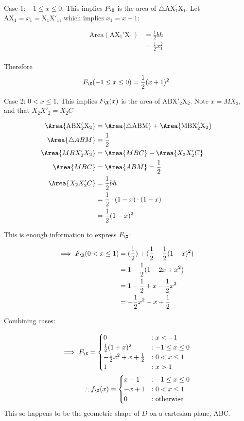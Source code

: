 Case 1: $-1 \leq x \leq 0$.
This implies $F_\X$ is the area of $\triangle\mathrm{A X_{1}^{\prime} X_1}$.
Let $\mathrm{AX_1} = x_1 = \mathrm{X_1 X'_1}$, which implies $x_1 = x + 1$:

\begin{align*}
\mathrm{Area(AX_1'X_1)} &= \frac{1}{2}bh \\
&= \frac{1}{2}x_1^2 \\
\end{align*}

Therefore
\[
F_\X(-1 \leq x \leq 0) = \frac{1}{2}(x + 1)^2
\]

Case 2: $0 < x \leq 1$.
This implies $F_\X(x)$ is the area of $\mathrm{ABX'_2X_2}$.
Note $x = MX_2$, and that $X_2X'_2 = X_2C$

\begin{align*}
\Area{\mathrm{ABX'_2X_2}} &= \Area{\triangle\mathrm{ABM}} + \Area{\mathrm{MBX_2'X_2}} \\
\Area{\triangle ABM} &= \frac{1}{2} \\
\Area{MBX'_2X_2} &= \Area{MBC} - \Area{X_2X_2'C} \\
\Area{MBC} &= \Area{ABM} = \frac{1}{2} \\
\Area{X_2X_2'C} &= \frac{1}{2}bh \\
&= \frac{1}{2} \cdot (1 - x) \cdot (1 - x) \\
&= \frac{1}{2}(1-x)^2 \\
\end{align*}

This is enough information to express $F_\X$:

\begin{align*}
\implies F_\X(0 < x \leq 1) &= (\frac{1}{2}) + (\frac{1}{2} - \frac{1}{2}(1 - x)^2) \\
&= 1 - \frac{1}{2}(1 - 2x + x^2) \\
&= 1 - \frac{1}{2} + x - \frac{1}{2}x^2 \\
&= -\frac{1}{2}x^2 + x + \frac{1}{2}
\end{align*}

Combining cases:

\begin{align*}
\implies F_\X =
\begin{cases}
0 &: x < -1 \\
\frac{1}{2}(1 + x)^2 &: -1 \leq x \leq 0 \\
-\frac{1}{2}x^2 + x + \frac{1}{2} &: 0 < x \leq 1 \\
1 &: x > 1
\end{cases}\\
\therefore f_\X(x) = \begin{cases}
x + 1 &: -1 \leq x \leq 0 \\
-x + 1 &: 0 < x \leq 1 \\
0 &: \text{otherwise}
\end{cases}
\end{align*}
This so happens to be the geometric shape of $D$ on a cartesian plane, ABC.

